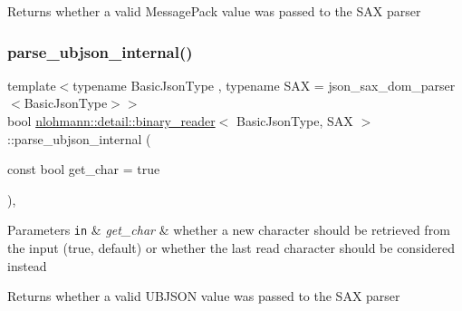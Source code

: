 \begin{DoxyReturn}{Returns}
whether a valid Message\+Pack value was passed to the S\+AX parser 
\end{DoxyReturn}
\mbox{\label{classnlohmann_1_1detail_1_1binary__reader_af60c6bba6f1301cb02e0186c99e25751}} 
\subsubsection{\texorpdfstring{parse\+\_\+ubjson\+\_\+internal()}{parse\_ubjson\_internal()}}
{\footnotesize\ttfamily template$<$typename Basic\+Json\+Type , typename S\+AX  = json\+\_\+sax\+\_\+dom\+\_\+parser$<$\+Basic\+Json\+Type$>$$>$ \\
bool \hyperlink{classnlohmann_1_1detail_1_1binary__reader}{nlohmann\+::detail\+::binary\+\_\+reader}$<$ Basic\+Json\+Type, S\+AX $>$\+::parse\+\_\+ubjson\+\_\+internal (\begin{DoxyParamCaption}\item[{const bool}]{get\+\_\+char = {\ttfamily true} }\end{DoxyParamCaption})\hspace{0.3cm}{\ttfamily [inline]}, {\ttfamily [private]}}


\begin{DoxyParams}[1]{Parameters}
\mbox{\tt in}  & {\em get\+\_\+char} & whether a new character should be retrieved from the input (true, default) or whether the last read character should be considered instead\\
\hline
\end{DoxyParams}
\begin{DoxyReturn}{Returns}
whether a valid U\+B\+J\+S\+ON value was passed to the S\+AX parser 
\end{DoxyReturn}
\mbox{\label{classnlohmann_1_1detail_1_1binary__reader_ab94a54d6e595c2620b07589cf4116256}} 
